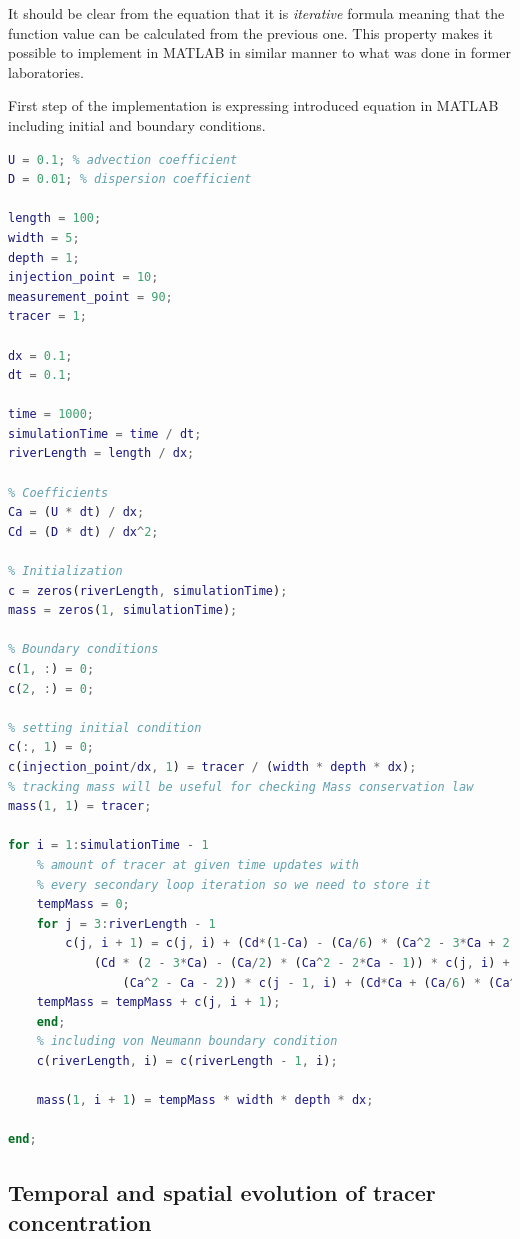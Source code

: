 \documentclass[12pt]{article}
\begin{document}
It should be clear from the equation that it is \textit{iterative} formula meaning that the function value can be calculated from the previous one. This property makes it possible to implement in MATLAB in similar manner to what was done in former laboratories.

First step of the implementation is expressing introduced equation in MATLAB including initial and boundary conditions.

\begin{lstlisting}[language=Matlab, caption = {QUICKEST method implemented in MATLAB.}, label = {lst1}, frame=single]
% setting up initial parameters 
U = 0.1; % advection coefficient
D = 0.01; % dispersion coefficient

length = 100;
width = 5;
depth = 1;
injection_point = 10;
measurement_point = 90;
tracer = 1;

dx = 0.1;
dt = 0.1;

time = 1000;
simulationTime = time / dt;
riverLength = length / dx;

% Coefficients 
Ca = (U * dt) / dx;
Cd = (D * dt) / dx^2;

% Initialization
c = zeros(riverLength, simulationTime);
mass = zeros(1, simulationTime);

% Boundary conditions
c(1, :) = 0;
c(2, :) = 0;

% setting initial condition
c(:, 1) = 0;
c(injection_point/dx, 1) = tracer / (width * depth * dx);
% tracking mass will be useful for checking Mass conservation law
mass(1, 1) = tracer;

for i = 1:simulationTime - 1
	% amount of tracer at given time updates with
	% every secondary loop iteration so we need to store it
	tempMass = 0;
	for j = 3:riverLength - 1
		c(j, i + 1) = c(j, i) + (Cd*(1-Ca) - (Ca/6) * (Ca^2 - 3*Ca + 2)) *c(j + 1, i) - ...
			(Cd * (2 - 3*Ca) - (Ca/2) * (Ca^2 - 2*Ca - 1)) * c(j, i) + (Cd * (1 - 3*Ca) - (Ca/2) * ...
				(Ca^2 - Ca - 2)) * c(j - 1, i) + (Cd*Ca + (Ca/6) * (Ca^2 - 1)) * c(j - 2, i);
	tempMass = tempMass + c(j, i + 1);
	end;
	% including von Neumann boundary condition
	c(riverLength, i) = c(riverLength - 1, i);

	mass(1, i + 1) = tempMass * width * depth * dx;
	
end;
\end{lstlisting}

\subsection{Temporal and spatial evolution of tracer concentration}
\end{document}
